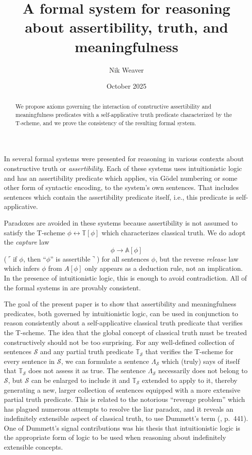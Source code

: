 \documentclass{amsart}
\title[Assertibility, truth, and meaningfulness]{A formal system for reasoning about assertibility, truth, and meaningfulness}
\author{Nik Weaver}
\date{October 2025}
\theoremstyle{definition}
\begin{document}
\begin{abstract}
We propose axioms governing the interaction of constructive assertibility and meaningfulness predicates with a self-applicative truth predicate characterized by the T-scheme, and we prove the consistency of the resulting formal system.
\end{abstract}

\maketitle

In \cite{weaver} several formal systems were presented for reasoning in various contexts about constructive truth or {\it assertibility}. Each of these systems uses intuitionistic logic and has an assertibility predicate which applies, via G\"odel numbering or some other form of syntactic encoding, to the system's own sentences. That includes sentences which contain the assertibility predicate itself, i.e., this predicate is self-applicative.

Paradoxes are avoided in these systems because assertibility is not assumed to satisfy the T-scheme $\phi \leftrightarrow \mathbb{T}[\phi]$ which characterizes classical truth. We do adopt the {\it capture} law $$\phi \to \mathbb{A}[\phi]$$ ($\ulcorner$if $\phi$, then ``$\phi$'' is assertible$\urcorner$) for all sentences $\phi$, but the reverse {\it release} law which infers $\phi$ from $A[\phi]$ only appears as a deduction rule, not an implication. In the presence of intuitionistic logic, this is enough to avoid contradiction. All of the formal systems in \cite{weaver} are provably consistent.

The goal of the present paper is to show that assertibility and meaningfulness predicates, both governed by intuitionistic logic, can be used in conjunction to reason consistently about a self-applicative classical truth predicate that verifies the T-scheme. The idea that the global concept of classical truth must be treated constructively should not be too surprising. For any well-defined collection of sentences $\mathcal{S}$ and any partial truth predicate $\mathbb{T}_\mathcal{S}$ that verifies the T-scheme for every sentence in $\mathcal{S}$, we can formulate a sentence $\Lambda_\mathcal{S}$ which (truly) says of itself that $\mathbb{T}_\mathcal{S}$ does not assess it as true. The sentence $\Lambda_\mathcal{S}$ necessarily does not belong to $\mathcal{S}$, but $\mathcal{S}$ can be enlarged to include it and $\mathbb{T}_\mathcal{S}$ extended to apply to it, thereby generating a new, larger collection of sentences equipped with a more extensive partial truth predicate. This is related to the notorious ``revenge problem'' which has plagued numerous attempts to resolve the liar paradox, and it reveals an indefinitely extensible aspect of classical truth, to use Dummett's term (\cite{dummett2}, p.\ 441). One of Dummett's signal contributions was his thesis that intuitionistic logic is the appropriate form of logic to be used when reasoning about indefinitely extensible concepts.
\end{document}
